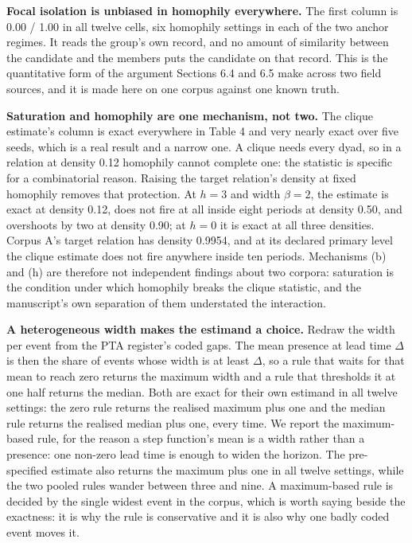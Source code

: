 \documentclass[twoside,11pt]{article}
\begin{document}
\textbf{Focal isolation is unbiased in homophily everywhere.} The first column is 0.00 / 1.00 in all twelve cells, six homophily settings in each of the two anchor regimes. It reads the group's own record, and no amount of similarity between the candidate and the members puts the candidate on that record. This is the quantitative form of the argument Sections 6.4 and 6.5 make across two field sources, and it is made here on one corpus against one known truth.

\textbf{Saturation and homophily are one mechanism, not two.} The clique estimate's column is exact everywhere in Table 4 and very nearly exact over five seeds, which is a real result and a narrow one. A clique needs every dyad, so in a relation at density 0.12 homophily cannot complete one: the statistic is specific for a combinatorial reason. Raising the target relation's density at fixed homophily removes that protection. At \(h = 3\) and width \(\beta = 2\), the estimate is exact at density 0.12, does not fire at all inside eight periods at density 0.50, and overshoots by two at density 0.90; at \(h = 0\) it is exact at all three densities. Corpus A's target relation has density 0.9954, and at its declared primary level the clique estimate does not fire anywhere inside ten periods. Mechanisms (b) and (h) are therefore not independent findings about two corpora: saturation is the condition under which homophily breaks the clique statistic, and the manuscript's own separation of them understated the interaction.

\textbf{A heterogeneous width makes the estimand a choice.} Redraw the width per event from the PTA register's coded gaps. The mean presence at lead time \(\Delta\) is then the share of events whose width is at least \(\Delta\), so a rule that waits for that mean to reach zero returns the maximum width and a rule that thresholds it at one half returns the median. Both are exact for their own estimand in all twelve settings: the zero rule returns the realised maximum plus one and the median rule returns the realised median plus one, every time. We report the maximum-based rule, for the reason a step function's mean is a width rather than a presence: one non-zero lead time is enough to widen the horizon. The pre-specified estimate also returns the maximum plus one in all twelve settings, while the two pooled rules wander between three and nine. A maximum-based rule is decided by the single widest event in the corpus, which is worth saying beside the exactness: it is why the rule is conservative and it is also why one badly coded event moves it.
\end{document}
